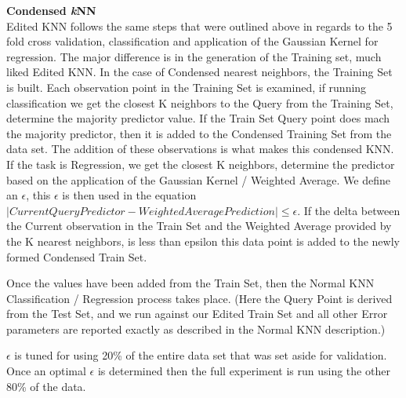 \documentclass[twoside,11pt]{article}
\begin{document}
\textbf{Condensed \textit{k}NN}\\
\hspace*{10mm} Edited KNN follows the same steps that were outlined above in regards to the 5 fold cross validation, classification and application of the Gaussian Kernel for regression. The major difference is in the generation of the Training set, much liked Edited KNN. In the case of Condensed nearest neighbors, the Training Set is built. Each observation point in the Training Set is examined, if running classification we get the closest K neighbors to the Query from the Training Set, determine the majority predictor value. If the Train Set Query point does mach the majority predictor, then it is added to the Condensed Training Set from the data set. The addition of these observations is what makes this condensed KNN. If the task is Regression, we get the closest K neighbors, determine the predictor based on the application of the Gaussian Kernel / Weighted Average. We define an $\epsilon$, this $\epsilon$ is then used in the equation $|Current Query Predictor - Weighted Average Prediction| \leq \epsilon$.\newline
If the delta between the Current observation in the Train Set and the Weighted Average provided by the K nearest neighbors, is less than epsilon this data point is added to the newly formed Condensed Train Set.\newline

Once the values have been added from the Train Set, then the Normal KNN Classification / Regression process takes place. (Here the Query Point is derived from the Test Set, and we run against our Edited Train Set and all other Error parameters are reported exactly as described in the Normal KNN description.)\newline

$\epsilon$ is tuned for using 20\% of the entire data set that was set aside for validation. Once an optimal $\epsilon$ is determined then the full experiment is run using the other 80\% of the data.
\end{document}
